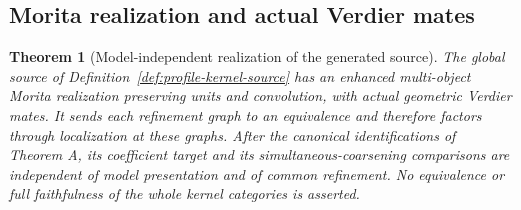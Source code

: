 \documentclass[11pt]{article}
\newtheorem{theorem}{Theorem}[section]
\theoremstyle{definition}
\theoremstyle{remark}
\begin{document}
\subsection{Morita realization and actual Verdier mates}
\begin{theorem}[Model-independent realization of the generated source]
\label{thm:kernel-morita-verdier}
The global source of Definition~\ref{def:profile-kernel-source} has
an enhanced multi-object Morita realization preserving units and
convolution, with actual geometric Verdier mates.  It sends each
refinement graph to an equivalence and therefore factors through
localization at these graphs.  After the canonical identifications
of Theorem A, its coefficient target and its simultaneous-coarsening
comparisons are independent of model presentation and of common
refinement.  No equivalence or full faithfulness of the whole kernel
categories is asserted.
\end{theorem}
\end{document}
